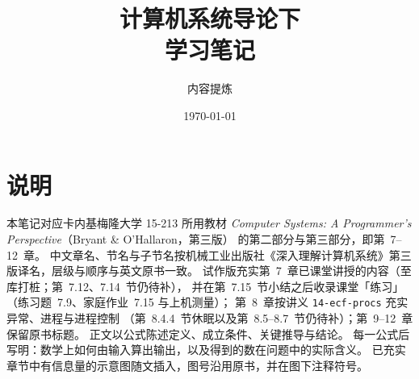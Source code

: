 \documentclass[UTF8,zihao=-4,openany]{ctexbook}
\title{\heiti 计算机系统导论下\\[0.4em]\Large 学习笔记}
\author{内容提炼}
\date{\today}
\begin{document}
\maketitle
\frontmatter

\chapter*{说明}
本笔记对应卡内基梅隆大学 15-213 所用教材
\emph{Computer Systems: A Programmer's Perspective}（Bryant \& O'Hallaron，第三版）
的第二部分与第三部分，即第~7--12~章。
中文章名、节名与子节名按机械工业出版社《深入理解计算机系统》第三版译名，层级与顺序与英文原书一致。
试作版充实第~7~章已课堂讲授的内容（至库打桩；第~7.12、7.14~节仍待补），
并在第~7.15~节小结之后收录课堂「练习」（练习题~7.9、家庭作业~7.15 与上机测量）；
第~8~章按讲义 \texttt{14-ecf-procs} 充实异常、进程与进程控制
（第~8.4.4~节休眠以及第~8.5--8.7~节仍待补）；第~9--12~章保留原书标题。
正文以公式陈述定义、成立条件、关键推导与结论。
每一公式后写明：数学上如何由输入算出输出，以及得到的数在问题中的实际含义。
已充实章节中有信息量的示意图随文插入，图号沿用原书，并在图下注释符号。

\hypertarget{contents}{}
\tableofcontents

\mainmatter
\setcounter{chapter}{6}






\end{document}
